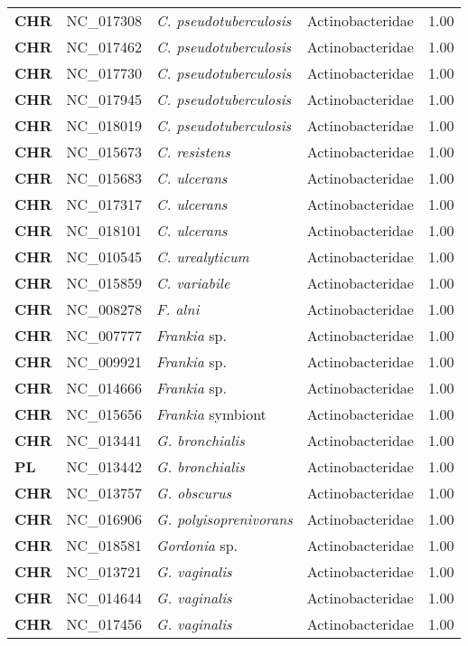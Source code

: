 \begin{adjustwidth}{-3cm}{2cm}
{\begin{supertabular}{>{\bfseries}l|p{0.1\textwidth}p{0.14\textwidth}l|l}
CHR & NC\_017308 & \textit{C. pseudotuberculosis} & Actinobacteridae & 1.00\\
CHR & NC\_017462 & \textit{C. pseudotuberculosis} & Actinobacteridae & 1.00\\
CHR & NC\_017730 & \textit{C. pseudotuberculosis} & Actinobacteridae & 1.00\\
CHR & NC\_017945 & \textit{C. pseudotuberculosis} & Actinobacteridae & 1.00\\
CHR & NC\_018019 & \textit{C. pseudotuberculosis} & Actinobacteridae & 1.00\\
CHR & NC\_015673 & \textit{C. resistens} & Actinobacteridae & 1.00\\
CHR & NC\_015683 & \textit{C. ulcerans} & Actinobacteridae & 1.00\\
CHR & NC\_017317 & \textit{C. ulcerans} & Actinobacteridae & 1.00\\
CHR & NC\_018101 & \textit{C. ulcerans} & Actinobacteridae & 1.00\\
CHR & NC\_010545 & \textit{C. urealyticum} & Actinobacteridae & 1.00\\
CHR & NC\_015859 & \textit{C. variabile} & Actinobacteridae & 1.00\\
CHR & NC\_008278 & \textit{F. alni} & Actinobacteridae & 1.00\\
CHR & NC\_007777 & \textit{Frankia }sp. & Actinobacteridae & 1.00\\
CHR & NC\_009921 & \textit{Frankia }sp. & Actinobacteridae & 1.00\\
CHR & NC\_014666 & \textit{Frankia }sp. & Actinobacteridae & 1.00\\
CHR & NC\_015656 & \textit{Frankia }symbiont & Actinobacteridae & 1.00\\
CHR & NC\_013441 & \textit{G. bronchialis} & Actinobacteridae & 1.00\\
PL & NC\_013442 & \textit{G. bronchialis} & Actinobacteridae & 1.00\\
CHR & NC\_013757 & \textit{G. obscurus} & Actinobacteridae & 1.00\\
CHR & NC\_016906 & \textit{G. polyisoprenivorans} & Actinobacteridae & 1.00\\
CHR & NC\_018581 & \textit{Gordonia} sp. & Actinobacteridae & 1.00\\
CHR & NC\_013721 & \textit{G. vaginalis} & Actinobacteridae & 1.00\\
CHR & NC\_014644 & \textit{G. vaginalis} & Actinobacteridae & 1.00\\
CHR & NC\_017456 & \textit{G. vaginalis} & Actinobacteridae & 1.00\\

\end{supertabular}}
\end{adjustwidth}
